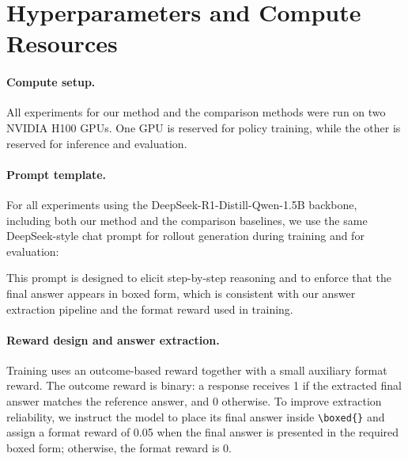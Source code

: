 \documentclass{article}
\begin{document}
\section{Hyperparameters and Compute Resources}
\label{app:exp_details}

\paragraph{Compute setup.}
All experiments for our method and the comparison methods were run on two NVIDIA H100 GPUs. One GPU is reserved for policy training, while the other is reserved for inference and evaluation. 

\paragraph{Prompt template.}
For all experiments using the DeepSeek-R1-Distill-Qwen-1.5B backbone, including both our method and the comparison baselines, we use the same DeepSeek-style chat prompt for rollout generation during training and for evaluation:

\begin{center}
\end{center}

This prompt is designed to elicit step-by-step reasoning and to enforce that the final answer appears in boxed form, which is consistent with our answer extraction pipeline and the format reward used in training.


\paragraph{Reward design and answer extraction.}
Training uses an outcome-based reward together with a small auxiliary format reward. The outcome reward is binary: a response receives 1 if the extracted final answer matches the reference answer, and 0 otherwise. To improve extraction reliability, we instruct the model to place its final answer inside \texttt{\textbackslash boxed\{\}} and assign a format reward of 0.05 when the final answer is presented in the required boxed form; otherwise, the format reward is 0.
\end{document}
